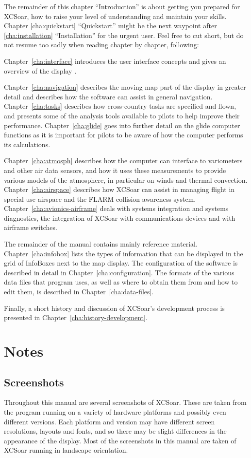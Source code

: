 The remainder of this chapter ``Introduction'' is about getting you prepared for
XCSoar, how to raise your level of understanding and maintain your skills. 
Chapter \ref{cha:quickstart} ``Quickstart'' might be the next waypoint after
\ref{cha:installation} ``Installation'' for the urgent user. Feel free to cut
short, but do not resume too sadly when reading chapter by chapter, following:

Chapter~\ref{cha:interface} introduces the user interface
concepts and gives an overview of the display .

Chapter~\ref{cha:navigation} describes the moving map part of the
display in greater detail and describes how the software can assist in
general navigation.  Chapter~\ref{cha:tasks} describes how
cross-country tasks are specified and flown, and presents some of the
analysis tools available to pilots to help improve their performance.
Chapter~\ref{cha:glide} goes into further detail on the glide computer
functions as it is important for pilots to be aware of how the
computer performs its calculations.

Chapter~\ref{cha:atmosph} describes how the computer can interface to
variometers and other air data sensors, and how it uses these
measurements to provide various models of the atmosphere, in
particular on winds and thermal convection.
Chapter~\ref{cha:airspace} describes how XCSoar can assist in managing
flight in special use airspace and the FLARM collision awareness
system.  Chapter~\ref{cha:avionics-airframe} deals with systems
integration and systems diagnostics, the integration of XCSoar with
communications devices and with airframe switches.

The remainder of the manual contains mainly reference material.
Chapter~\ref{cha:infobox} lists the types of information that can be
displayed in the grid of InfoBoxes next to the map display.  The
configuration of the software is described in detail in
Chapter~\ref{cha:configuration}.  The formats of the various data
files that program uses, as well as where to obtain them from and how
to edit them, is described in Chapter~\ref{cha:data-files}.

Finally, a short history and discussion of XCSoar's development
process is presented in Chapter~\ref{cha:history-development}.

\section{Notes}

\subsection*{Screenshots}
Throughout this manual are several screenshots of XCSoar. These are
taken from the program running on a variety of hardware platforms and possibly
even different versions. Each platform and version may have different screen
resolutions, layouts and fonts, and so there may be slight differences in the
appearance of the display. Most of the screenshots in this manual are taken of
XCSoar running in landscape orientation.

